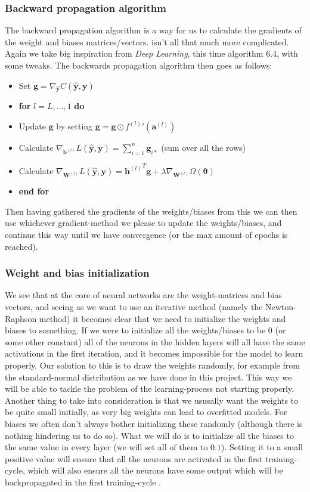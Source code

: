 \documentclass{article}
\begin{document}
\subsubsection{Backward propagation algorithm}
\label{backprop}
The backward propagation algorithm is a way for us to calculate the gradients of
the weight and biases matrices/vectors. isn't all that much more complicated.
Again we take big inspiration from \textit{Deep Learning}, this time algorithm
6.4, with some tweaks. The backwards propagation algorithm then goes as follows:
\begin{itemize}
      \item Set $\bm{g} = \nabla_{\hat{\bm{y}}} C(\hat{\bm{y}}, \bm{y})$
      \item \textbf{for} $l = L, \dots, 1$ \textbf{do}
      \item Update $\bm{g}$ by setting $\bm{g} = \bm{g} \odot {f^{(l)}}' (\bm{a}^{(l)})$
      \item Calculate $\nabla_{\bm{b}^{(l)}} L(\hat{\bm{y}}, \bm{y}) = \sum_{i=1}^n \bm{g}_{i *}$ (sum over all the rows)
      \item Calculate $\nabla_{\bm{W}^{(l)}} L(\hat{\bm{y}}, \bm{y}) = {\bm{h}^{(l)}}^T \bm{g} + \lambda \nabla_{\bm{W}^{(l)}} \Omega(\bm{\theta})$
      \item \textbf{end for}
\end{itemize}
Then having gathered the gradients of the weights/biases from this we can then
use whichever gradient-method we please to update the weights/biases, and
continue this way until we have convergence (or the max amount of epochs is
reached).

\subsubsection{Weight and bias initialization}
We see that at the core of neural networks are the weight-matrices and bias
vectors, and seeing as we want to use an iterative method (namely the
Newton-Raphson method) it becomes clear that we need to initialize the weights
and biases to something. If we were to initialize all the weights/biases to be
$0$ (or some other constant) all of the neurons in the hidden layers will all
have the same activations in the first iteration, and it becomes impossible for
the model to learn properly. Our solution to this is to draw the weights randomly, for
example from the standard-normal distribution as we have done in this project.
This way we will be able to tackle the problem of the learning-process not
starting properly. Another thing to take into consideration is that we ususally
want the weights to be quite small initially, as very big weights can lead to
overfitted models. For biases we often don't always bother initializing these
randomly (although there is nothing hindering us to do so).  What we will do is to
initialize all the biases to the same value in every layer (we will set all of them to
$0.1$).  Setting it to a small positive value will ensure that all the neurons
are activated in the first training-cycle, which will also ensure all the
neurons have some output which will be backpropagated in the first
training-cycle \cite[s.~Weights and biases]{week41}.
\end{document}
